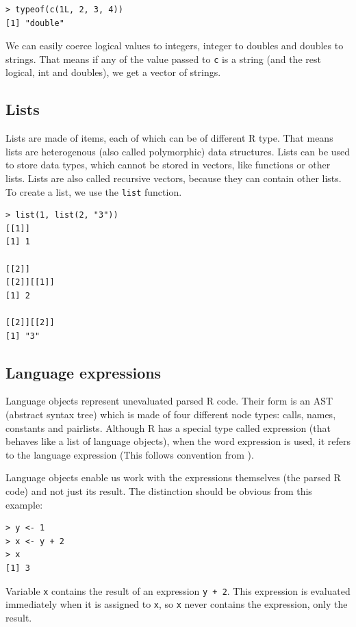 \documentclass[thesis=B,english]{FITthesis}[2012/10/20]
\begin{document}
\begin{verbatim}
> typeof(c(1L, 2, 3, 4))
[1] "double"
\end{verbatim}

We can easily coerce logical values to integers, integer to doubles and doubles to strings. That means if any of the value passed to \verb|c| is a string (and the rest logical, int and doubles), we get a vector of strings.

\subsection{Lists}
Lists are made of items, each of which can be of different R type. That means lists are heterogenous (also called polymorphic) data structures\cite{advR}. Lists can be used to store data types, which cannot be stored in vectors, like functions or other lists. Lists are also called recursive vectors, because they can contain other lists. To create a list, we use the \verb|list| function.

\begin{verbatim}
> list(1, list(2, "3"))
[[1]]
[1] 1

[[2]]
[[2]][[1]]
[1] 2

[[2]][[2]]
[1] "3"
\end{verbatim}

\subsection{Language expressions}
Language objects represent unevaluated parsed R code. Their form is an AST (abstract syntax tree) which is made of four different node types: calls, names, constants and pairlists. Although R has a special type called expression (that behaves like a list of language objects), when the word expression is used, it refers to the language expression (This follows convention from \cite{advR}).

Language objects enable us work with the expressions themselves (the parsed R code) and not just its result. The distinction should be obvious from this example:

\begin{verbatim}
> y <- 1
> x <- y + 2
> x
[1] 3
\end{verbatim}

Variable \verb|x| contains the result of an expression \verb|y + 2|. This expression is evaluated immediately when it is assigned to \verb|x|, so \verb|x| never contains the expression, only the result.
\end{document}
